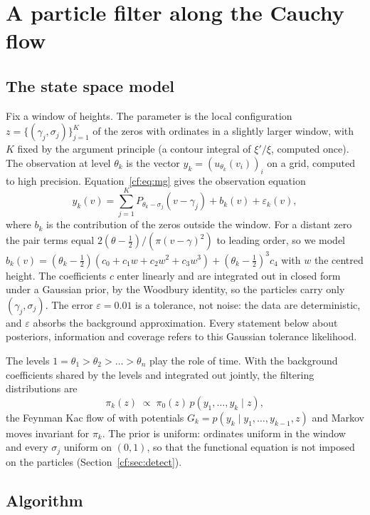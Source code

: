 \section{A particle filter along the Cauchy flow}\label{cf:sec:pf}

\subsection{The state space model}\label{cf:sec:model}

Fix a window of heights. The parameter is the local configuration $z=\{(\gamma_j,\sigma_j)\}_{j=1}^K$ of the zeros with ordinates in a slightly larger window, with $K$ fixed by the argument principle (a contour integral of $\xi'/\xi$, computed once). The observation at level $\theta_k$ is the vector $y_k=(u_{\theta_k}(v_i))_i$ on a grid, computed to high precision. Equation~\eqref{cf:eq:mg} gives the observation equation
\[
y_k(v)=\sum_{j=1}^KP_{\theta_k-\sigma_j}(v-\gamma_j)+b_k(v)+\varepsilon_k(v),
\]
where $b_k$ is the contribution of the zeros outside the window. For a distant zero the pair terms equal $2(\theta-\frac12)/(\pi(v-\gamma)^2)$ to leading order, so we model $b_k(v)=(\theta_k-\frac12)(c_0+c_1w+c_2w^2+c_3w^3)+(\theta_k-\frac12)^3c_4$ with $w$ the centred height. The coefficients $c$ enter linearly and are integrated out in closed form under a Gaussian prior, by the Woodbury identity, so the particles carry only $(\gamma_j,\sigma_j)$. The error $\varepsilon=0.01$ is a tolerance, not noise: the data are deterministic, and $\varepsilon$ absorbs the background approximation. Every statement below about posteriors, information and coverage refers to this Gaussian tolerance likelihood.

The levels $1=\theta_1>\theta_2>\dots>\theta_n$ play the role of time. With the background coefficients shared by the levels and integrated out jointly, the filtering distributions are
\[
\pi_k(z)\;\propto\;\pi_0(z)\,p(y_1,\dots,y_k\mid z),
\]
the Feynman Kac flow of \cite{PSH626} with potentials $G_k=p(y_k\mid y_1,\dots,y_{k-1},z)$ and Markov moves invariant for $\pi_k$. The prior is uniform: ordinates uniform in the window and every $\sigma_j$ uniform on $(0,1)$, so that the functional equation is not imposed on the particles (Section~\ref{cf:sec:detect}).

\subsection{Algorithm}

